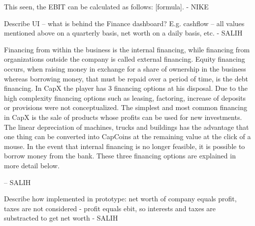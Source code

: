 This seen, the EBIT can be calculated as follows: [formula]. - NIKE

Describe UI – what is behind the Finance dashboard? E.g. cashflow – all values mentioned above on a quarterly basis, net worth on a daily basis, etc. - SALIH

Financing from within the business is the internal financing, while financing from organizations outside the company is called external financing. Equity financing occurs, when raising money in exchange for a share of ownership in the business whereas borrowing money, that must be repaid over a period of time, is the debt financing. 
In CapX the player has 3 financing options at his disposal. Due to the high complexity financing options such as leasing, factoring, increase of deposits or provisions were not conceptualized. 
The simplest and most common financing in CapX is the sale of products whose profits can be used for new investments. The linear depreciation of machines, trucks and buildings has the advantage that one thing can be converted into CapCoins at the remaining value at the click of a mouse.
In the event that internal financing is no longer feasible, it is possible to borrow money from the bank. These three financing options are explained in more detail below.

– SALIH

Describe how implemented in prototype: net worth of company equals profit, taxes are not considered - profit equals ebit, so interests and taxes are substracted to get net worth - SALIH